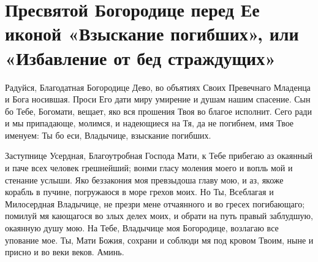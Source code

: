 \section{Пресвятой Богородице перед Ее иконой «Взыскание погибших», или «Избавление от бед страждущих»}\begin{mymulticols}




Радуйся, Благодатная Богородице Дево, во объятиях Своих Превечнаго Младенца и Бога носившая. Проси Его дати миру умирение и душам нашим спасение. Сын бо Тебе, Богомати, вещает, яко вся прошения Твоя во благое исполнит. Сего ради и мы припадающе, молимся, и надеющиеся на Тя, да не погибнем, имя Твое именуем: Ты бо еси, Владычице, взыскание погибших.




Заступнице Усердная, Благоутробная Господа Мати, к Тебе прибегаю аз окаянный и паче всех человек грешнейший; вонми гласу моления моего и вопль мой и стенание услыши. Яко беззакония моя превзыдоша главу мою, и аз, якоже корабль в пучине, погружаюся в море грехов моих. Но Ты, Всеблагая и Милосердная Владычице, не презри мене отчаянного и во гресех погибающаго; помилуй мя кающагося во злых делех моих, и обрати на путь правый заблудшую, окаянную душу мою. На Тебе, Владычице моя Богородице, возлагаю все упование мое. Ты, Мати Божия, сохрани и соблюди мя под кровом Твоим, ныне и присно и во веки веков. Аминь.


\end{mymulticols}

